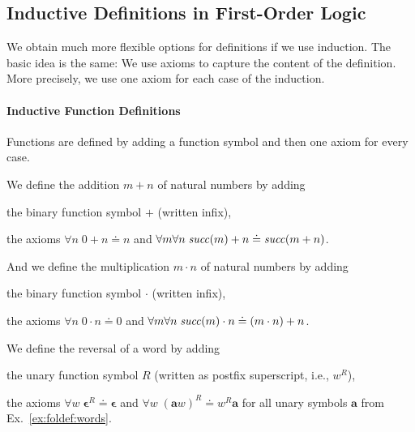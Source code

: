 \subsection{Inductive Definitions in First-Order Logic}

We obtain much more flexible options for definitions if we use induction.
The basic idea is the same: We use axioms to capture the content of the definition.
More precisely, we use one axiom for each case of the induction.

\paragraph{Inductive Function Definitions}
Functions are defined by adding a function symbol and then one axiom for every case.

\begin{example}\label{ex:foldef:nat4}
We define the addition $m+n$ of natural numbers by adding
\begin{compactitem}
\item the binary function symbol $+$ (written infix),
\item the axioms $\forall n\;0+n\doteq n$ and $\forall m\forall n\;\mathit{succ}(m)+n\doteq\mathit{succ}(m+n)$.
\end{compactitem}

And we define the multiplication $m\cdot n$ of natural numbers by adding
\begin{compactitem}
\item the binary function symbol $\cdot$ (written infix),
\item the axioms $\forall n\;0\cdot n\doteq 0$ and $\forall m\forall n\;\mathit{succ}(m)\cdot n\doteq (m\cdot n)+n$.
\end{compactitem}
\end{example}

\begin{example}\label{ex:foldef:words3}
We define the reversal of a word by adding
\begin{compactitem}
\item the unary function symbol $R$ (written as postfix superscript, i.e., $w^R$),
\item the axioms $\forall w\;\bm{\epsilon}^R\doteq \bm{\epsilon}$ and $\forall w\;(\bm{a}w)^R\doteq w^R\bm{a}$ for all unary symbols $\bm{a}$ from Ex.~\ref{ex:foldef:words}.
\end{compactitem}
\end{example}

